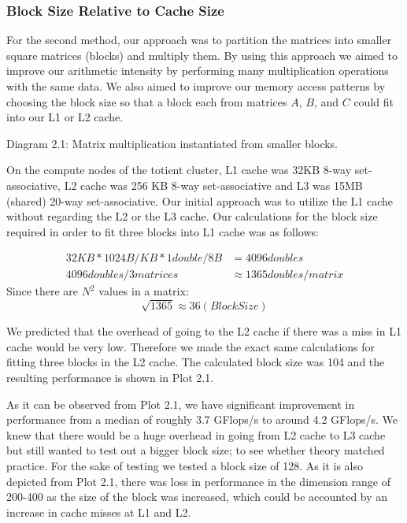 \documentclass[12pt]{article}
\begin{document}
\subsubsection{Block Size Relative to Cache Size}

For the second method, our approach was to partition the matrices into smaller square matrices (blocks) and multiply them. By using this approach we aimed to improve our arithmetic intensity by performing many multiplication operations with the same data. We also aimed to improve our memory access patterns by choosing the block size so that a block each from matrices $A$, $B$, and $C$ could fit into our L1 or L2 cache.

\begin{center}

Diagram 2.1: Matrix multiplication instantiated from smaller blocks.
\end{center}


On the compute nodes of the totient cluster, L1 cache was 32KB 8-way set-associative, L2 cache was 256 KB 8-way set-associative and L3 was 15MB (shared) 20-way set-associative. Our initial approach was to utilize the L1 cache without regarding the L2 or the L3 cache. Our calculations for the block size required in order to fit three blocks into L1 cache was as follows:

\begin{align*}
32KB * 1024B/KB * 1 double/8B &= 4096 doubles\\
4096 doubles / 3 matrices &\approx 1365 doubles/matrix
\end{align*}
Since there are $N^2$ values in a matrix: \[\sqrt{1365}\approx 36 (Block Size)\]



We predicted that the overhead of going to the L2 cache if there was a miss in L1 cache would be very low. Therefore we made the exact same calculations for fitting three blocks in the L2 cache. The calculated block size was 104 and the resulting performance is shown in Plot 2.1.

As it can be observed from Plot 2.1, we have significant improvement in performance from a median of roughly 3.7 GFlops/s to around 4.2 GFlops/s. We knew that there would be a huge overhead in going from L2 cache to L3 cache but still wanted to test out a bigger block size; to see whether theory matched practice. For the sake of testing we tested a block size of 128. As it is also depicted from Plot 2.1, there was loss in performance in the dimension range of 200-400 as the size of the block was increased, which could be accounted by an increase in cache misses at L1 and L2.
\end{document}
